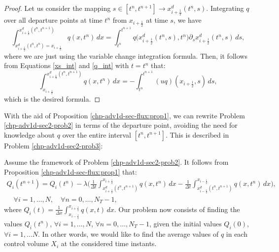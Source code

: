 \begin{proof}
	Let us consider the mapping $s\in[t^n,t^{n+1}] \to  x_{i+\frac{1}{2}}^d(t^n,s)$. 
	Integrating $q$ over all departure points at time $t^n$ from $x_{i+\frac{1}{2}}$ at time $s$, we have
	\begin{equation}
		\label{depint_1}
		\int^{ x_{i+\frac{1}{2}}^d(t^n,t^{n+1})}_{ x_{i+\frac{1}{2}}^d(t^n,t^{n}) = x_{i+\frac{1}{2}}}   
		q(x,t^n)\,dx 
		= \int_{t^n}^{t^{n+1}}  q\big( x_{i+\frac{1}{2}}^d(t^n,s),t^n\big){\partial_s}{ x_{i+\frac{1}{2}}^d} (t^n,s)\,ds,
	\end{equation}
	where we are just using the variable change integration formula.
	Then, it follows from Equations  \eqref{xs_int}
	and \eqref{q_int} with $t=t^n$ that:
	\begin{equation}
		\label{depint_2}
			\int^{ x_{i+\frac{1}{2}}^d(t^n,t^{n+1})}_{x_{i+\frac{1}{2}}} q(x,t^n)\,dx 
			= -\int_{t^n}^{t^{n+1}} ({u} q)(x_{i+\frac{1}{2}},s) \,ds, 
	\end{equation}
	which is the desired formula.
\end{proof}
With the aid of Proposition \ref{chp-adv1d-sec-flux:prop1}, we can rewrite Problem \ref{chp-adv1d-sec2-prob2}
in terms of the departure point, avoiding the need for knowledge about $q$ over the
entire interval $[t^n, t^{n+1}]$. This is described in Problem \ref{chp-adv1d-sec2-prob3}:
\begin{prob}
    \label{chp-adv1d-sec2-prob3}
	Assume the framework of Problem \ref{chp-adv1d-sec2-prob2}.
    It follows from Proposition \ref{chp-adv1d-sec-flux:prop1} that:
\begin{equation}
	\label{1d-fvslexact-scheme}
	\begin{split}
{Q}_i(t^{n+1}) =  {Q}_i(t^{n}) -
\lambda
\bigg( \frac{1}{\Delta t}\int_{x_{i+\frac{1}{2}}^d(t^n,t^{n+1})}^{x_{i+\frac{1}{2}}}{q}(x, t^n) \,dx-
\frac{1}{\Delta t} \int_{x_{i-\frac{1}{2}}^d(t^n,t^{n+1})}^{x_{i-\frac{1}{2}}}{q}(x, t^n) \,dx \bigg),\\
\quad \forall i = 1, \ldots, N,
\quad \forall n = 0, \ldots, N_T-1,
	\end{split}
\end{equation}
	where ${Q}_i(t) = \frac{1}{\Delta x}
	\int_{x_{i-\frac{1}{2}}}^{x_{i+\frac{1}{2}}} {q}(x,t) \,dx$.
	Our problem now consists of finding the values ${Q}_i(t^{n})$, 
	$\forall i = 1, \ldots, N$, $\forall n = 0, \ldots, N_T-1$,
	given the initial values ${Q}_i(0)$, $\forall i = 1, \ldots N$.
	In other words, we would like to find the average values of ${q}$
	in each control volume $X_i$ at the considered time instants.
\end{prob}
